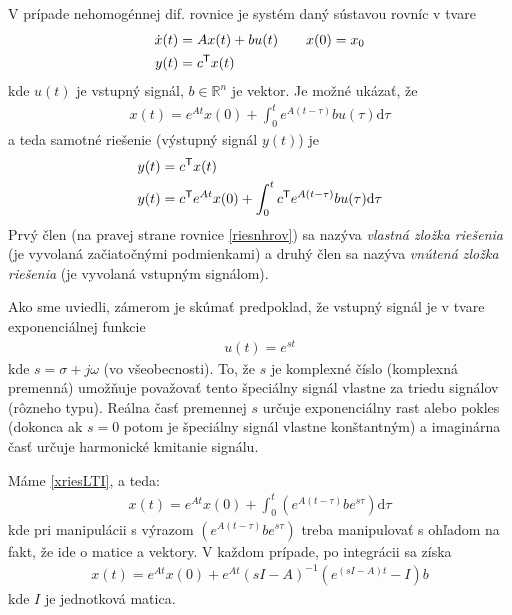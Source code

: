 \documentclass[a4paper, 10pt, ]{article}
\begin{document}
V prípade nehomogénnej dif. rovnice je systém daný sústavou rovníc v tvare
\begin{subequations} \label{sysLTIstavpries}
    \begin{align}
        \dot x(t) &= A x(t) + b u(t) \qquad x(0) = x_0 \\
        y(t) &= c^{\mathsf{T}} x(t)
    \end{align}
\end{subequations}
kde $u(t)$ je vstupný signál, $b \in \mathbb{R}^{n}$ je vektor. Je možné ukázať, že
\begin{align} \label{xriesLTI}
	x(t) = e^{At} x(0) + \int_0^t e^{A(t-\tau)} b u(\tau) \text{d}\tau
\end{align}
a teda samotné riešenie (výstupný signál $y(t)$) je
\begin{subequations}
    \begin{align}
        y(t) &= c^{\mathsf{T}} x(t) \\
        y(t) &= c^{\mathsf{T}} e^{At} x(0) + \int_0^t c^{\mathsf{T}} e^{A(t-\tau)} b u(\tau) \text{d}\tau \label{riesnhrov}
    \end{align}
\end{subequations}
Prvý člen (na pravej strane rovnice \eqref{riesnhrov}) sa nazýva \emph{vlastná zložka riešenia} (je vyvolaná začiatočnými podmienkami) a druhý člen sa nazýva  \emph{vnútená zložka riešenia} (je vyvolaná vstupným signálom).

Ako sme uviedli, zámerom je skúmať predpoklad, že vstupný signál je v tvare exponenciálnej funkcie
\begin{align}
	u(t) = e^{st}
\end{align}
kde $s = \sigma + j\omega$ (vo všeobecnosti). To, že $s$ je komplexné číslo (komplexná premenná) umožňuje považovať tento špeciálny signál vlastne za triedu signálov (rôzneho typu). Reálna časť premennej $s$ určuje exponenciálny rast alebo pokles (dokonca ak $s = 0$ potom je špeciálny signál vlastne konštantným) a imaginárna časť určuje harmonické kmitanie signálu.

Máme \eqref{xriesLTI}, a teda:
\begin{align}
	x(t) = e^{At} x(0) + \int_0^t \left( e^{A(t-\tau)} b e^{s\tau} \right) \text{d}\tau
\end{align}
kde pri manipulácii s výrazom $ \left( e^{A(t-\tau)} b e^{s\tau} \right)$ treba manipulovať s ohľadom na fakt, že ide o matice a vektory. V každom prípade, po integrácii sa získa
\begin{align}
	x(t) = e^{At} x(0) + e^{At} \left( sI - A \right)^{-1}  \left( e^{(sI-A)t} - I \right) b
\end{align}
kde $I$ je jednotková matica.
\end{document}
